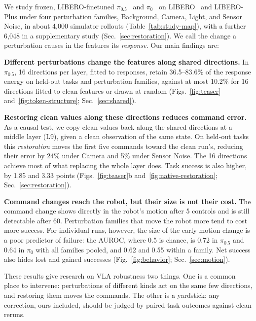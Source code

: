 We study frozen, LIBERO-finetuned $\pi_{0.5}$~\cite{pi05} and $\pi_0$~\cite{pi0} on LIBERO~\cite{libero} and LIBERO-Plus under four perturbation families, Background, Camera, Light, and Sensor Noise, in about 4,000 simulator rollouts (Table~\ref{tab:study-map}), with a further 6,048 in a supplementary study (Sec.~\ref{sec:restoration}). We call the change a perturbation causes in the features its \emph{response}. Our main findings are:

\textbf{Different perturbations change the features along shared directions.} In $\pi_{0.5}$, 16 directions per layer, fitted to responses, retain 36.5--83.6\% of the response energy on held-out tasks and perturbation families, against at most 10.2\% for 16 directions fitted to clean features or drawn at random (Figs.~\ref{fig:teaser} and~\ref{fig:token-structure}; Sec.~\ref{sec:shared}).

\textbf{Restoring clean values along these directions reduces command error.} As a causal test, we copy clean values back along the shared directions at a middle layer (L9), given a clean observation of the same state. On held-out tasks this \emph{restoration} moves the first five commands toward the clean run's, reducing their error by 24\% under Camera and 5\% under Sensor Noise. The 16 directions achieve most of what replacing the whole layer does. Task success is also higher, by 1.85 and 3.33 points (Figs.~\ref{fig:teaser}b and~\ref{fig:native-restoration}; Sec.~\ref{sec:restoration}).

\textbf{Command changes reach the robot, but their size is not their cost.} The command change shows directly in the robot's motion after 5 controls and is still detectable after 60. Perturbation families that move the robot more tend to cost more success. For individual runs, however, the size of the early motion change is a poor predictor of failure: the AUROC, where 0.5 is chance, is 0.72 in $\pi_{0.5}$ and 0.64 in $\pi_0$ with all families pooled, and 0.62 and 0.55 within a family. Net success also hides lost and gained successes (Fig.~\ref{fig:behavior}; Sec.~\ref{sec:motion}).

These results give research on VLA robustness two things. One is a common place to intervene: perturbations of different kinds act on the same few directions, and restoring them moves the commands. The other is a yardstick: any correction, ours included, should be judged by paired task outcomes against clean reruns.

